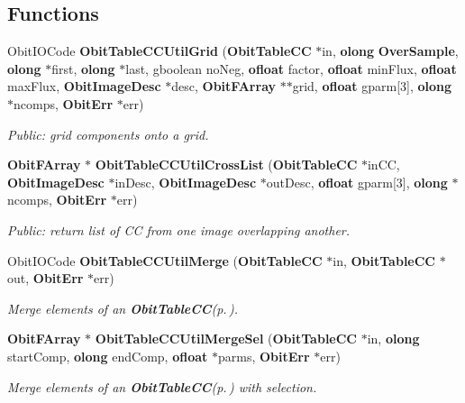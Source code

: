 \subsection*{Functions}
\begin{CompactItemize}
\item 
Obit\-IOCode {\bf Obit\-Table\-CCUtil\-Grid} ({\bf Obit\-Table\-CC} $\ast$in, {\bf olong} {\bf Over\-Sample}, {\bf olong} $\ast$first, {\bf olong} $\ast$last, gboolean no\-Neg, {\bf ofloat} factor, {\bf ofloat} min\-Flux, {\bf ofloat} max\-Flux, {\bf Obit\-Image\-Desc} $\ast$desc, {\bf Obit\-FArray} $\ast$$\ast$grid, {\bf ofloat} gparm[3], {\bf olong} $\ast$ncomps, {\bf Obit\-Err} $\ast$err)
\begin{CompactList}\small\item\em Public: grid components onto a grid. \item\end{CompactList}\item 
{\bf Obit\-FArray} $\ast$ {\bf Obit\-Table\-CCUtil\-Cross\-List} ({\bf Obit\-Table\-CC} $\ast$in\-CC, {\bf Obit\-Image\-Desc} $\ast$in\-Desc, {\bf Obit\-Image\-Desc} $\ast$out\-Desc, {\bf ofloat} gparm[3], {\bf olong} $\ast$ncomps, {\bf Obit\-Err} $\ast$err)
\begin{CompactList}\small\item\em Public: return list of CC from one image overlapping another. \item\end{CompactList}\item 
Obit\-IOCode {\bf Obit\-Table\-CCUtil\-Merge} ({\bf Obit\-Table\-CC} $\ast$in, {\bf Obit\-Table\-CC} $\ast$out, {\bf Obit\-Err} $\ast$err)
\begin{CompactList}\small\item\em Merge elements of an {\bf Obit\-Table\-CC}{\rm (p.\,\pageref{structObitTableCC})}. \item\end{CompactList}\item 
{\bf Obit\-FArray} $\ast$ {\bf Obit\-Table\-CCUtil\-Merge\-Sel} ({\bf Obit\-Table\-CC} $\ast$in, {\bf olong} start\-Comp, {\bf olong} end\-Comp, {\bf ofloat} $\ast$parms, {\bf Obit\-Err} $\ast$err)
\begin{CompactList}\small\item\em Merge elements of an {\bf Obit\-Table\-CC}{\rm (p.\,\pageref{structObitTableCC})} with selection. \item\end{CompactList}\item 
$$
\end{CompactItemize}
